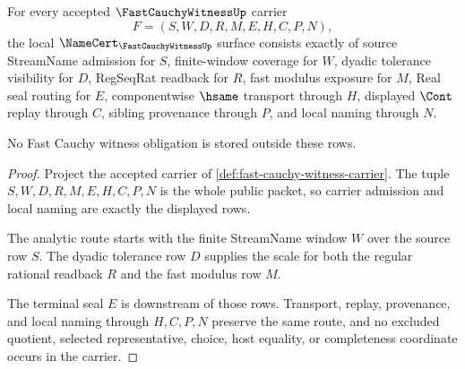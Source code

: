 \begin{theorem}
\label{thm:fast-cauchy-witness-namecert-obligations}
For every accepted $\FastCauchyWitnessUp$ carrier
$$
F=(S,W,D,R,M,E,H,C,P,N),
$$
the local $\NameCert_{\FastCauchyWitnessUp}$ surface consists exactly of source StreamName admission for $S$, finite-window coverage for $W$, dyadic tolerance visibility for $D$, RegSeqRat readback for $R$, fast modulus exposure for $M$, Real seal routing for $E$, componentwise $\hsame$ transport through $H$, displayed $\Cont$ replay through $C$, sibling provenance through $P$, and local naming through $N$.

No Fast Cauchy witness obligation is stored outside these rows.
\end{theorem}
\begin{proof}
Project the accepted carrier of \autoref{def:fast-cauchy-witness-carrier}. The tuple $S,W,D,R,M,E,H,C,P,N$ is the whole public packet, so carrier admission and local naming are exactly the displayed rows.

The analytic route starts with the finite StreamName window $W$ over the source row $S$. The dyadic tolerance row $D$ supplies the scale for both the regular rational readback $R$ and the fast modulus row $M$.

The terminal seal $E$ is downstream of those rows. Transport, replay, provenance, and local naming through $H,C,P,N$ preserve the same route, and no excluded quotient, selected representative, choice, host equality, or completeness coordinate occurs in the carrier.
\end{proof}


